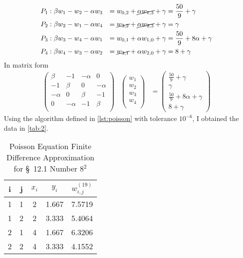 \documentclass[12pt]{article}
\begin{document}
\begin{equation}
  \label{eq:8_p}
  \begin{aligned}
    P_1&: \beta w_1 - w_2 - \alpha w_3
    &=w_{0,2}+\cancel{\alpha w_{1,3}} + \gamma &= \frac{50}{9} + \gamma \\
    P_2&: \beta w_2 - w_1 - \alpha w_4 
    &=\cancel{w_{3,2}} + \cancel{\alpha w_{2,3}} + \gamma &= \gamma \\
    P_3&: \beta w_3 - w_4 - \alpha w_1  &=w_{0,1}+\alpha
    w_{1,0} + \gamma &= \frac{50}{9} + 8\alpha +  \gamma \\
    P_4&: \beta w_4 - w_3 - \alpha w_2
    &=\cancel{w_{3,1}}+\alpha w_{2,0} + \gamma &= 8 +\gamma \\
  \end{aligned}
\end{equation}
In matrix form
\begin{equation}
  \label{eq:8_matrix}
  \begin{array}{ccc}
  \begin{pmatrix}
    \beta & -1 & -\alpha & 0 \\
    -1 & \beta & 0 & -\alpha \\
    -\alpha & 0 & \beta & -1 \\
    0 & -\alpha & -1 & \beta \\
  \end{pmatrix}
  & 
  \begin{pmatrix}
    w_1 \\
    w_2 \\
    w_3 \\
    w_4 \\
  \end{pmatrix}
  &=
  \begin{pmatrix}
    \frac{50}{9} + \gamma \\
    \gamma \\
    \frac{50}{9} + 8\alpha + \gamma \\
    8 + \gamma
  \end{pmatrix}
\end{array}
\end{equation}
Using the algorithm defined in \cref{lst:poisson} with tolerance
$10^{-6}$, I obtained the data in \cref{tab:2}.
\begin{table}[H]
  \centering
  \begin{tabular}{ccccc}
      \hline
      i & j & $x_i$ & $y_i$ & $w_{i,j}^{(19)}$ \\
      \hline
      1 & 1 & 2 & 1.667 & 7.5719 \\
      1 & 2 & 2 & 3.333 & 5.4064 \\
      2 & 1 & 4 & 1.667 & 6.3206 \\
      2 & 2 & 4 & 3.333 & 4.1552 \\
      \hline
  \end{tabular}
  \caption{Poisson Equation Finite Difference Approximation for
    \S~12.1 Number 8$^2$}
  \label{tab:8}
\end{table}
\end{document}
